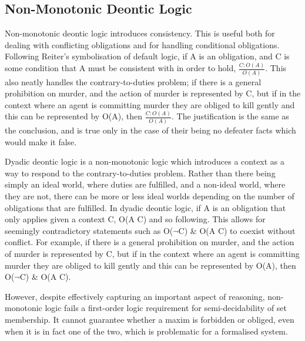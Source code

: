 \documentclass{l4proj}
\begin{document}
\subsection{Non-Monotonic Deontic Logic}%
Non-monotonic deontic logic introduces consistency\cite{Powers}. This is useful both for dealing with conflicting obligations and for handling conditional obligations\cite{Horty}. Following Reiter's symbolisation of default logic\cite{Reiter}, if A is an obligation, and C is some condition that A must be consistent with in order to hold, \( \frac{C : O(A)}{O(A)} \). This also neatly handles the contrary-to-duties problem; if there is a general prohibition on murder, and the action of murder is represented by C, but if in the context where an agent is committing murder they are obliged to kill gently and this can be represented by O(A), then \( \frac{C : O(A)}{O(A)} \). The justification is the same as the conclusion, and is true only in the case of their being no defeater facts which would make it false. 

Dyadic deontic logic is a non-monotonic logic which introduces a context as a way to respond to the contrary-to-duties problem. Rather than there being simply an ideal world, where duties are fulfilled, and a non-ideal world, where they are not, there can be more or less ideal worlds depending on the number of obligations that are fulfilled. In dyadic deontic logic, if A is an obligation that only applies given a context C, O(A \textbar C) and so following. This allows for seemingly contradictory statements such as O(\( \neg \)C) \& O(A \textbar C) to coexist without conflict. For example, if there is a general prohibition on murder, and the action of murder is represented by C, but if in the context where an agent is committing murder they are obliged to kill gently and this can be represented by O(A), then O(\( \neg \)C) \& O(A \textbar C). 

However, despite effectively capturing an important aspect of reasoning, non-monotonic logic fails a first-order logic requirement for semi-decidability of set membership. It cannot guarantee whether a maxim is forbidden or obliged, even when it is in fact one of the two, which is problematic for a formalised system. 
\end{document}
